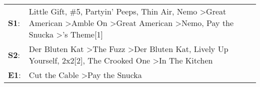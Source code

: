 \begin{supertabular}{p{0.03\textwidth}p{0.92\textwidth}}
 \textbf{S1}:  &  Little Gift\textsuperscript{}, \enspace \#5\textsuperscript{}, \enspace Partyin' Peeps\textsuperscript{}, \enspace Thin Air\textsuperscript{}, \enspace Nemo\textsuperscript{} \textgreater \enspace Great American\textsuperscript{} \textgreater \enspace Amble On\textsuperscript{} \textgreater \enspace Great American\textsuperscript{} \textgreater \enspace Nemo\textsuperscript{}, \enspace Pay the Snucka\textsuperscript{} \textgreater {}'s Theme[1]\textsuperscript{}  \enspace  \\
 \textbf{S2}:  &                                                                                                                                                                Der Bluten Kat\textsuperscript{} \textgreater \enspace The Fuzz\textsuperscript{} \textgreater \enspace Der Bluten Kat\textsuperscript{}, \enspace Lively Up Yourself\textsuperscript{}, \enspace 2x2[2]\textsuperscript{}, \enspace The Crooked One\textsuperscript{} \textgreater \enspace In The Kitchen\textsuperscript{}  \enspace  \\
 \textbf{E1}:  &                                                                                                                                                                                                                                                                                                                                                                                                       Cut the Cable\textsuperscript{} \textgreater \enspace Pay the Snucka\textsuperscript{}  \enspace  \\
\end{supertabular}
